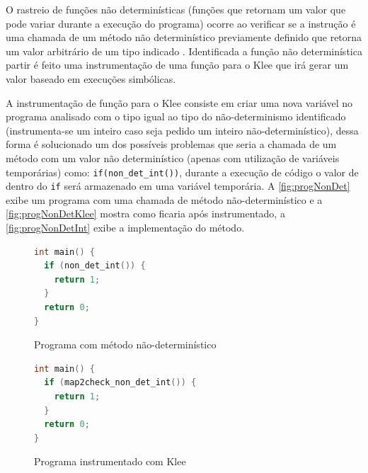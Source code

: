 O rastreio de funções não determinísticas (funções que retornam um valor que pode variar durante a execução do programa) ocorre ao verificar se a instrução é uma chamada de um método não determinístico previamente definido que retorna um valor arbitrário de um tipo indicado \cite{beyer:2016}. Identificada a função não determinística partir é feito uma instrumentação de uma função para o Klee que irá gerar um valor baseado em execuções simbólicas.
\par
A instrumentação de função para o Klee consiste em criar uma nova variável no programa analisado com o tipo igual ao tipo do não-determinismo identificado (instrumenta-se um inteiro caso seja pedido um inteiro não-determinístico), dessa forma é solucionado um dos possíveis problemas que seria a chamada de um método com um valor não determinístico (apenas com utilização de variáveis temporárias) como: \texttt{if(non\_det\_int())}, durante a execução de código o valor de dentro do \texttt{if} será armazenado em uma variável temporária. A \autoref{fig:progNonDet} exibe um programa com uma chamada de método não-determinístico e a \autoref{fig:progNonDetKlee} mostra como ficaria após instrumentado,   a \autoref{fig:progNonDetInt} exibe a implementação do método.

\begin{figure}[H]
\caption{\label{fig:progNonDet} Programa com método não-determinístico}
\begin{center}
\begin{minipage}{0.8\textwidth}
  \begin{lstlisting}[language=C]
int main() {
  if (non_det_int()) {
    return 1;
  }
  return 0;
}
\end{lstlisting}
\end{minipage}
\end{center}
\end{figure}

\begin{figure}[H]
\caption{\label{fig:progNonDetKlee} Programa instrumentado com Klee}
\begin{center}
\begin{minipage}{0.8\textwidth}
  \begin{lstlisting}[language=C]
int main() {
  if (map2check_non_det_int()) {
    return 1;
  }
  return 0;
}
\end{lstlisting}
\end{minipage}
\end{center}
\end{figure}


